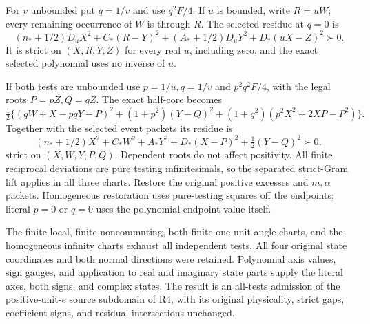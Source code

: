 For $v$ unbounded put $q=1/v$ and use $q^2F/4$. If $u$ is bounded,
write $R=uW$; every remaining occurrence of $W$ is through $R$.
The selected residue at $q=0$ is
\[
 (n_*+1/2)D_uX^2+C_*(R-Y)^2
       +(A_*+1/2)D_uY^2+D_*(uX-Z)^2\succ0.           \tag{R4E15}
\]
It is strict on $(X,R,Y,Z)$ for every real $u$, including zero,
and the exact selected polynomial uses no inverse of $u$.

If both tests are unbounded use $p=1/u,q=1/v$ and $p^2q^2F/4$,
with the legal roots $P=pZ,Q=qZ$. The exact half-core becomes
\[
 \tfrac12\{(qW+X-pqY-P)^2+(1+p^2)(Y-Q)^2
                       +(1+q^2)(p^2X^2+2XP-P^2)\}.
\]
Together with the selected event packets its residue is
\[
 (n_*+1/2)X^2+C_*W^2+A_*Y^2+D_*(X-P)^2
                                  +\tfrac12(Y-Q)^2\succ0,       \tag{R4E16}
\]
strict on $(X,W,Y,P,Q)$. Dependent roots do not affect positivity.
All finite reciprocal deviations are pure testing infinitesimals,
so the separated strict-Gram lift applies in all three charts.
Restore the original positive excesses and $m,\alpha$ packets.
Homogeneous restoration uses pure-testing squares off the endpoints;
literal $p=0$ or $q=0$ uses the polynomial endpoint value itself.

The finite local, finite noncommuting, both finite one-unit-angle
charts, and the homogeneous infinity charts exhaust all independent
tests. All four original state coordinates and both normal directions
were retained. Polynomial axis values, sign gauges, and application to
real and imaginary state parts supply the literal axes, both signs,
and complex states. The result is an all-tests admission of the
positive-unit-$e$ source subdomain of R4, with its original physicality,
strict gaps, coefficient signs, and residual intersections unchanged.
